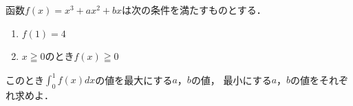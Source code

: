 \documentclass[../../main.tex]{subfiles}
\begin{document}
函数$f(x)=x^3+ax^2+bx$は次の条件を満たすものとする．
\begin{enumerate}
  \item $f(1)=4$
  \item $x \geqq 0$のとき$f(x) \geqq 0$
\end{enumerate}
このとき$\displaystyle\int_0^1 f(x)dx$の値を最大にする$a$，$b$の値，
最小にする$a$，$b$の値をそれぞれ求めよ．
\end{document}
